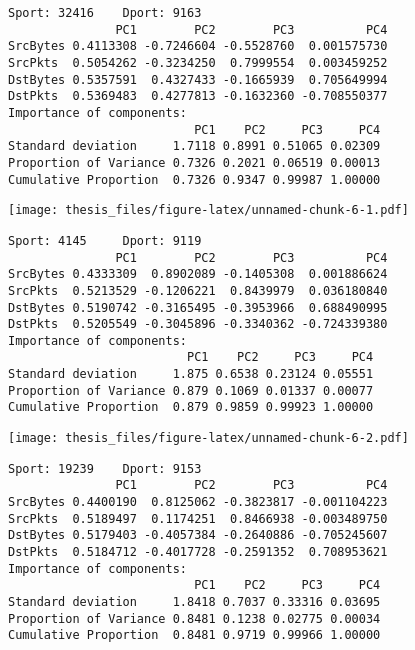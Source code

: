 \documentclass[12pt,twoside]{dukestatscithesis}
\theoremstyle{definition}
\theoremstyle{definition}
\theoremstyle{definition}
\theoremstyle{remark}
\begin{document}
\begin{Shaded}
\begin{Highlighting}[]
  \NormalTok{(}\NormalTok{, combo_table$Dport[}\NormalTok{],}\NormalTok{)}
  \StringTok{  }
  \StringTok{  }
  \StringTok{  }
  \StringTok{  }
\NormalTok{\}}
\end{Highlighting}
\end{Shaded}
\begin{verbatim}
Sport: 32416    Dport: 9163 
               PC1        PC2        PC3          PC4
SrcBytes 0.4113308 -0.7246604 -0.5528760  0.001575730
SrcPkts  0.5054262 -0.3234250  0.7999554  0.003459252
DstBytes 0.5357591  0.4327433 -0.1665939  0.705649994
DstPkts  0.5369483  0.4277813 -0.1632360 -0.708550377
Importance of components:
                          PC1    PC2     PC3     PC4
Standard deviation     1.7118 0.8991 0.51065 0.02309
Proportion of Variance 0.7326 0.2021 0.06519 0.00013
Cumulative Proportion  0.7326 0.9347 0.99987 1.00000
\end{verbatim}
\texttt{[image: thesis\_files/figure-latex/unnamed-chunk-6-1.pdf]}
\begin{verbatim}
Sport: 4145     Dport: 9119 
               PC1        PC2        PC3          PC4
SrcBytes 0.4333309  0.8902089 -0.1405308  0.001886624
SrcPkts  0.5213529 -0.1206221  0.8439979  0.036180840
DstBytes 0.5190742 -0.3165495 -0.3953966  0.688490995
DstPkts  0.5205549 -0.3045896 -0.3340362 -0.724339380
Importance of components:
                         PC1    PC2     PC3     PC4
Standard deviation     1.875 0.6538 0.23124 0.05551
Proportion of Variance 0.879 0.1069 0.01337 0.00077
Cumulative Proportion  0.879 0.9859 0.99923 1.00000
\end{verbatim}
\texttt{[image: thesis\_files/figure-latex/unnamed-chunk-6-2.pdf]}
\begin{verbatim}
Sport: 19239    Dport: 9153 
               PC1        PC2        PC3          PC4
SrcBytes 0.4400190  0.8125062 -0.3823817 -0.001104223
SrcPkts  0.5189497  0.1174251  0.8466938 -0.003489750
DstBytes 0.5179403 -0.4057384 -0.2640886 -0.705245607
DstPkts  0.5184712 -0.4017728 -0.2591352  0.708953621
Importance of components:
                          PC1    PC2     PC3     PC4
Standard deviation     1.8418 0.7037 0.33316 0.03695
Proportion of Variance 0.8481 0.1238 0.02775 0.00034
Cumulative Proportion  0.8481 0.9719 0.99966 1.00000
\end{verbatim}
\end{document}
